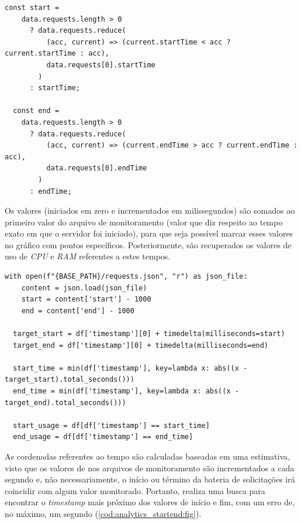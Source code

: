 \documentclass[12pt]{article}
\begin{document}
\begin{lstlisting}[caption={Recuperação dos valores de início e fim da bateria de solicitações.}, label=cod:analytics_startend]
	const start =
    data.requests.length > 0
      ? data.requests.reduce(
          (acc, current) => (current.startTime < acc ? current.startTime : acc),
          data.requests[0].startTime
        )
      : startTime;

  const end =
    data.requests.length > 0
      ? data.requests.reduce(
          (acc, current) => (current.endTime > acc ? current.endTime : acc),
          data.requests[0].endTime
        )
      : endTime;
\end{lstlisting}

Os valores (iniciados em zero e incrementados em milissegundos) são somados ao primeiro valor do arquivo de monitoramento
(valor que diz respeito ao tempo exato em que o servidor foi iniciado), para que seja possível marcar esses valores no 
gráfico com pontos específicos. Posteriormente, são recuperados os valores de uso de \textit{CPU} e \textit{RAM} referentes
a estes tempos.

\begin{lstlisting}[caption={Recuperação das coordenadas de início e fim da bateria de solicitações.}, label=cod:analytics_startend:fig]
  with open(f"{BASE_PATH}/requests.json", "r") as json_file:
    content = json.load(json_file)
    start = content['start'] - 1000
    end = content['end'] - 1000

  target_start = df['timestamp'][0] + timedelta(milliseconds=start)
  target_end = df['timestamp'][0] + timedelta(milliseconds=end)

  start_time = min(df['timestamp'], key=lambda x: abs((x - target_start).total_seconds()))
  end_time = min(df['timestamp'], key=lambda x: abs((x - target_end).total_seconds()))

  start_usage = df[df['timestamp'] == start_time]
  end_usage = df[df['timestamp'] == end_time]
\end{lstlisting}

As cordenadas referentes ao tempo são calculadas baseadas em uma estimativa, visto que os valores de 
nos arquivos de monitoramento são incrementados a cada segundo e, não necessariamente, o início ou término da bateria de 
solicitações irá coincidir com algum valor monitorado. Portanto, realiza uma busca
para encontrar o \textit{timestamp} mais próximo dos valores de início e fim, com um erro de, no máximo, um segundo (\autoref{cod:analytics_startend:fig}).
\end{document}
